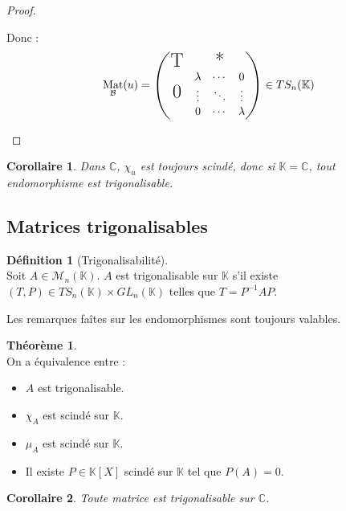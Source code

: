 \documentclass[12pt]{book}
\let\ensembleNombre\mathbb
\newcommand*\C{\ensuremath{\ensembleNombre{C}}}
\newcommand*\K{\ensuremath{\ensembleNombre{K}}}
\newcommand*\B{\ensuremath{\mathcal B}}
\DeclareMathOperator{\Mat}{Mat}
\newtheorem*{cor}{Corollaire}
\theoremstyle{definition}
\newtheorem*{defi}{Définition}
\newtheorem{thme}{Théorème}[chapter]
\theoremstyle{remark}
\newenvironment{fdef}
  {\begin{mdframed}[roundcorner=10pt, linewidth=1pt]\begin{defi}}
  {\end{defi}\end{mdframed}}
\newenvironment{fthme}
  {\begin{mdframed}[roundcorner=10pt, linewidth=2pt]\begin{thme}}
  {\end{thme}\end{mdframed}}
\begin{document}
\begin{proof}
\begin{itemize}
\begin{itemize}
		Donc : 		
		\[\Mat_\B (u) = \begin{pmatrix} \mbox{\LARGE T} & \mbox{\LARGE *} \\ \mbox{\LARGE 0} & \begin{matrix} \lambda & \cdots & 0 \\ \vdots & \ddots & \vdots \\ 0 & \cdots & \lambda \end{matrix} \end{pmatrix} \in TS_n(\K) \] \qedhere		
		\end{itemize}
	\end{itemize}
	\end{proof}
	
	\begin{cor}
	Dans $\C$, $\chi_u$ est toujours scindé, donc si $\K = \C$, tout endomorphisme est trigonalisable.
	\end{cor}
	
	\subsection{Matrices trigonalisables}
	\begin{fdef}[Trigonalisabilité]\mbox{~}\\
	Soit $A \in \mathcal M_n(\K)$. $A$ est trigonalisable sur $\K$ s'il existe $(T,P) \in TS_n(\K) \times GL_n(\K)$ telles que $T = P^{-1}AP$.
	\end{fdef}
	
	Les remarques faîtes sur les endomorphismes sont toujours valables. 
	
	\begin{fthme}\mbox{~}\\
	On a équivalence entre :
	\begin{itemize}
	\item[1)] $A$ est trigonalisable.
	\item[2)] $\chi_A$ est scindé sur $\K$.
	\item[3)] $\mu_A$ est scindé sur $\K$.
	\item[4)] Il existe $P \in \K[X]$ scindé sur $\K$ tel que $P(A) = 0$.
	\end{itemize}
	\end{fthme}
	
	\begin{cor}
	Toute matrice est trigonalisable sur $\C$.
	\end{cor}
	
\end{document}
